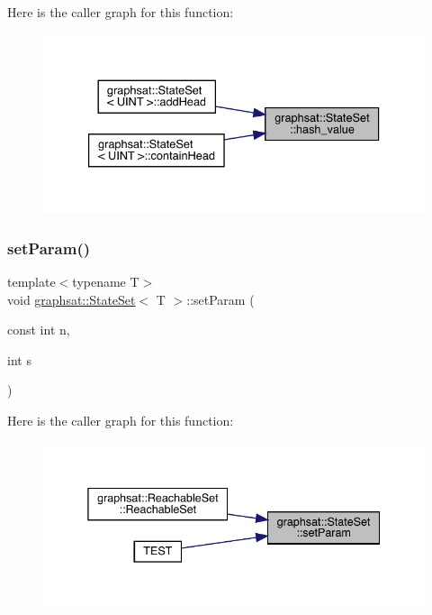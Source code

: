 Here is the caller graph for this function\+:
\nopagebreak
\begin{figure}[H]
\begin{center}
\leavevmode
\includegraphics[width=333pt]{classgraphsat_1_1_state_set_aaf7bbbad618682dd6d747b1c388d4995_icgraph}
\end{center}
\end{figure}
\mbox{\label{classgraphsat_1_1_state_set_aaa4c599c542c6634fd7b7e6fb4697e2d}} 
\subsubsection{\texorpdfstring{setParam()}{setParam()}}
{\footnotesize\ttfamily template$<$typename T$>$ \\
void \mbox{\hyperlink{classgraphsat_1_1_state_set}{graphsat\+::\+State\+Set}}$<$ T $>$\+::set\+Param (\begin{DoxyParamCaption}\item[{const int}]{n,  }\item[{int}]{s }\end{DoxyParamCaption})\hspace{0.3cm}{\ttfamily [inline]}}

Here is the caller graph for this function\+:
\nopagebreak
\begin{figure}[H]
\begin{center}
\leavevmode
\includegraphics[width=338pt]{classgraphsat_1_1_state_set_aaa4c599c542c6634fd7b7e6fb4697e2d_icgraph}
\end{center}
\end{figure}
\mbox{\label{classgraphsat_1_1_state_set_a2ba142c5b450dd427534c48c4a9e0791}} 
